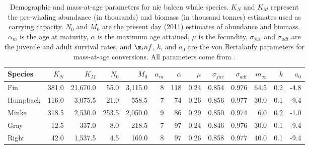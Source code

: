 \begin{table}

\caption{\label{tab:species_params}Demographic and mass-at-age parameters for nie baleen whale species. $K_N$ and $K_M$ represent the pre-whaling abundance (in thousands) and biomass (in thousand tonnes) estimates used as carrying capacity. $N_0$ and $M_0$ are the present day (2011) estimates of abundance and biomass. $\alpha_m$ is the age at maturity, $\alpha$ is the maximum age attained, $\mu$ is the fecundity, $\sigma_{juv}$ and $\sigma_{adt}$ are the juvenile and adult survival rates, and $\m_inf$, $k$, and $a_0$ are the von Bertalanfy parameters for mass-at-age conversions. All parameters come from \citet{pershing2010impact}.}
\centering
\begin{tabular}[t]{lrrrrrrrrrrrr}
\toprule
Species & $K_N$ & $K_M$ & $N_0$ & $M_0$ & $\alpha_m$ & $\alpha$ & $\mu$ & $\sigma_{juv}$ & $\sigma_{adt}$ & $m_\infty$ & $k$ & $a_0$\\
\midrule
Fin & 381.0 & 21,670.0 & 55.0 & 3,115.0 & 8 & 118 & 0.24 & 0.854 & 0.976 & 64.5 & 0.2 & -4.8\\
Humpback & 116.0 & 3,075.5 & 21.0 & 558.5 & 7 & 74 & 0.26 & 0.856 & 0.977 & 30.0 & 0.1 & -9.4\\
Minke & 318.5 & 2,530.0 & 253.5 & 2,050.0 & 9 & 86 & 0.29 & 0.850 & 0.974 & 6.0 & 0.2 & -1.0\\
Gray & 12.5 & 337.0 & 8.0 & 218.5 & 7 & 97 & 0.24 & 0.846 & 0.976 & 30.0 & 0.1 & -9.4\\
Right & 42.0 & 1,537.5 & 4.5 & 169.0 & 8 & 97 & 0.26 & 0.858 & 0.977 & 40.0 & 0.1 & -9.4\\
\bottomrule
\end{tabular}
\end{table}